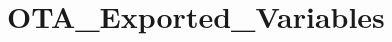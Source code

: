 \hypertarget{group___o_t_a___exported___variables}{}\section{O\+T\+A\+\_\+\+Exported\+\_\+\+Variables}
\label{group___o_t_a___exported___variables}
